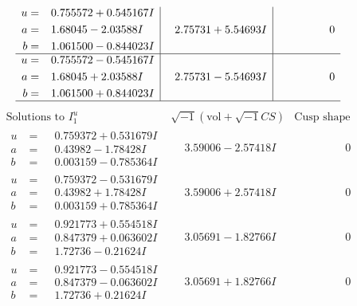 \documentclass[1p]{elsarticle_modified}
\theoremstyle{definition}
\newcommand{\I}{\sqrt{-1}}
\begin{document}
$$\begin{array}{c|c|c}
\begin{aligned}
u &= \phantom{-}0.755572 + 0.545167 I \\
a &= \phantom{-}1.68045 - 2.03588 I \\
b &= \phantom{-}1.061500 - 0.844023 I\end{aligned}
 & \phantom{-}2.75731 + 5.54693 I & \phantom{-0.000000 } 0 \\ \hline\begin{aligned}
u &= \phantom{-}0.755572 - 0.545167 I \\
a &= \phantom{-}1.68045 + 2.03588 I \\
b &= \phantom{-}1.061500 + 0.844023 I\end{aligned}
 & \phantom{-}2.75731 - 5.54693 I & \phantom{-0.000000 } 0\\
 \hline 
 \end{array}$$\newpage$$\begin{array}{c|c|c}  
\text{Solutions to }I^u_{1}& \I (\text{vol} + \sqrt{-1}CS) & \text{Cusp shape}\\
 \hline 
\begin{aligned}
u &= \phantom{-}0.759372 + 0.531679 I \\
a &= \phantom{-}0.43982 - 1.78428 I \\
b &= \phantom{-}0.003159 - 0.785364 I\end{aligned}
 & \phantom{-}3.59006 - 2.57418 I & \phantom{-0.000000 } 0 \\ \hline\begin{aligned}
u &= \phantom{-}0.759372 - 0.531679 I \\
a &= \phantom{-}0.43982 + 1.78428 I \\
b &= \phantom{-}0.003159 + 0.785364 I\end{aligned}
 & \phantom{-}3.59006 + 2.57418 I & \phantom{-0.000000 } 0 \\ \hline\begin{aligned}
u &= \phantom{-}0.921773 + 0.554518 I \\
a &= \phantom{-}0.847379 + 0.063602 I \\
b &= \phantom{-}1.72736 - 0.21624 I\end{aligned}
 & \phantom{-}3.05691 - 1.82766 I & \phantom{-0.000000 } 0 \\ \hline\begin{aligned}
u &= \phantom{-}0.921773 - 0.554518 I \\
a &= \phantom{-}0.847379 - 0.063602 I \\
b &= \phantom{-}1.72736 + 0.21624 I\end{aligned}
 & \phantom{-}3.05691 + 1.82766 I & \phantom{-0.000000 } 0 \\ \hline\begin{aligned}

\end{aligned}
\end{array}$$
\end{document}
